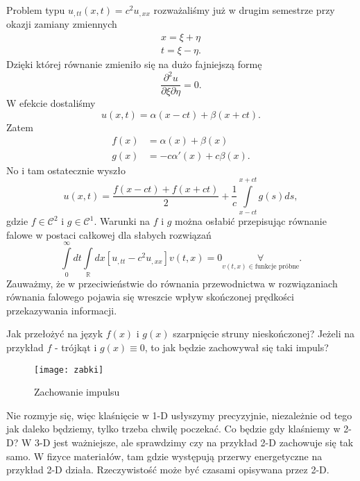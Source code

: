 \documentclass[../main.tex]{subfiles}
\begin{document}
Problem typu $u_{,tt}(x,t) = c^2 u_{,x x}$ rozważaliśmy już w drugim semestrze przy okazji zamiany zmiennych
\begin{align*}
		x = \xi + \eta\\
t = \xi - \eta
.\end{align*}
Dzięki której równanie zmieniło się na dużo fajniejszą formę
\[
\frac{\partial ^2 u}{\partial \xi \partial \eta } = 0
.\]
W efekcie dostaliśmy
\[
		u(x,t) = \alpha(x-ct) + \beta(x+ct)
.\]
Zatem
\begin{align*}
		f(x) &= \alpha(x) + \beta(x)\\
		g(x) &= -c\alpha'(x) + c\beta(x)
.\end{align*}
No i tam ostatecznie wyszło
\[
		u(x,t) = \frac{f(x-ct) + f(x+ct)}{2} + \frac{1}{c} \int\limits_{x-ct}^{x+ct} g(s)  d s
,\]
gdzie $f\in \mathcal{C}^2$ i $g\in \mathcal{C}^1$. Warunki na $f$ i $g$ można osłabić przepisując równanie falowe w postaci całkowej dla słabych rozwiązań
\[
		\int\limits_0^\infty dt \int\limits_\mathbb{R} dx \left[ u_{,t t} - c^2 u_{,x x} \right] v(t,x) = 0 \underset{v(t,x)\in \text{funkcje próbne}}{\forall}
.\]
Zauważmy, że w przeciwieństwie do równania przewodnictwa w rozwiązaniach równania falowego pojawia się wreszcie wpływ skończonej prędkości przekazywania informacji.
\begin{pytanie}
		Jak przełożyć na język $f(x)$ i $g(x)$ szarpnięcie struny nieskończonej?
		Jeżeli na przykład $f$ - trójkąt i $g(x) \equiv 0$, to jak będzie zachowywał się taki impuls?
		\begin{figure}[h]
				\centering
				\texttt{[image: zabki]}
				\caption{Zachowanie impulsu}
				\label{fig:zabki}
		\end{figure}
\end{pytanie}
Nie rozmyje się, więc klaśnięcie w 1-D usłyszymy precyzyjnie, niezależnie od tego jak daleko będziemy, tylko trzeba chwilę poczekać. Co będzie gdy klaśniemy w 2-D? W 3-D jest ważniejsze, ale sprawdzimy czy na przykład 2-D zachowuje się tak samo. W fizyce materiałów, tam gdzie występują przerwy energetyczne na przykład 2-D działa. Rzeczywistość może być czasami opisywana przez 2-D.
\end{document}
